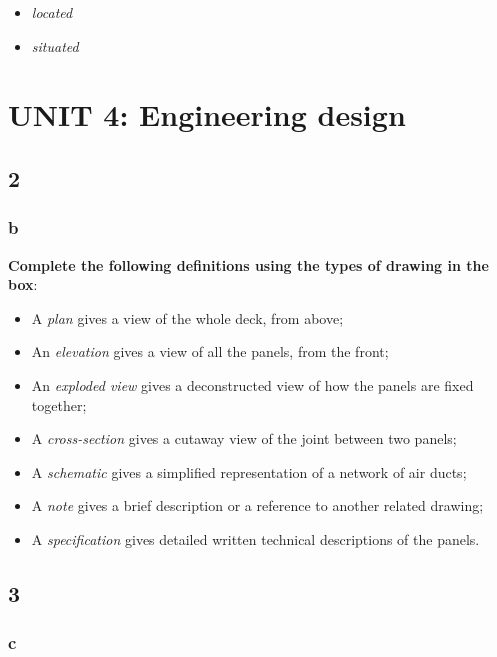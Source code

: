 \begin{itemize}

\item\textit{located}
\item\textit{situated}

\end{itemize}

\section{UNIT 4: Engineering design}

\subsection{2}

\subsubsection{b}

\textbf{Complete the following definitions using the types of drawing in the box}:

\begin{itemize}

\item A \textit{plan} gives a view of the whole deck, from above;
\item An \textit{elevation} gives a view of all the panels, from the front;
\item An \textit{exploded view} gives a deconstructed view of how the panels are fixed together;
\item A \textit{cross-section} gives a cutaway view of the joint between two panels;
\item A \textit{schematic} gives a simplified representation of a network of air ducts;
\item A \textit{note} gives a brief description or a reference to another related drawing;
\item A \textit{specification} gives detailed written technical descriptions of the panels.

\end{itemize}

\subsection{3}

\subsubsection{c}


